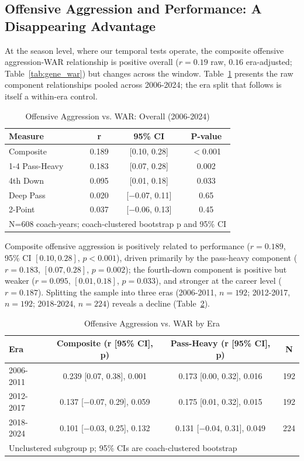 \documentclass[USenglish]{article}
\theoremstyle{dgthm}
\theoremstyle{dgdef}
\begin{document}
\subsection{Offensive Aggression and Performance: A Disappearing Advantage}

At the season level, where our temporal tests operate, the composite offensive aggression-WAR relationship is positive overall ($r=0.19$ raw, $0.16$ era-adjusted; Table~\ref{tab:gene_war}) but changes across the window. Table~\ref{tab:overall_war} presents the raw component relationships pooled across 2006-2024; the era split that follows is itself a within-era control.

\begin{table}[H]
\caption{Offensive Aggression vs. WAR: Overall (2006-2024)}
\label{tab:overall_war}
\begin{tabular}{lccc}
\toprule
\textbf{Measure} & \textbf{r} & \textbf{95\% CI} & \textbf{P-value} \\
\midrule
Composite & 0.189 & [0.10, 0.28] & $<$0.001 \\
\cmidrule{1-4}
Pass-Heavy & 0.183 & [0.07, 0.28] & 0.002 \\
4th Down & 0.095 & [0.01, 0.18] & 0.033 \\
Deep Pass & 0.020 & [$-$0.07, 0.11] & 0.65 \\
2-Point & 0.037 & [$-$0.06, 0.13] & 0.45 \\
\midrule
\multicolumn{4}{l}{\small N=608 coach-years; coach-clustered bootstrap p and 95\% CI}\\
\bottomrule
\end{tabular}
\end{table}

Composite offensive aggression is positively related to performance ($r=0.189$, 95\% CI $[0.10, 0.28]$, $p<0.001$), driven primarily by the pass-heavy component ($r=0.183$, $[0.07, 0.28]$, $p=0.002$); the fourth-down component is positive but weaker ($r=0.095$, $[0.01, 0.18]$, $p=0.033$), and stronger at the career level ($r=0.187$). Splitting the sample into three eras (2006-2011, $n=192$; 2012-2017, $n=192$; 2018-2024, $n=224$) reveals a decline (Table~\ref{tab:era_war}).

\begin{table}[H]
\caption{Offensive Aggression vs. WAR by Era}
\label{tab:era_war}
\small
\begin{tabular}{lccc}
\toprule
\textbf{Era} & \textbf{Composite (r [95\% CI], p)} & \textbf{Pass-Heavy (r [95\% CI], p)} & \textbf{N} \\
\midrule
2006-2011 & 0.239 [0.07, 0.38], 0.001 & 0.173 [0.00, 0.32], 0.016 & 192 \\
2012-2017 & 0.137 [$-$0.07, 0.29], 0.059 & 0.175 [0.01, 0.32], 0.015 & 192 \\
2018-2024 & 0.101 [$-$0.03, 0.25], 0.132 & 0.131 [$-$0.04, 0.31], 0.049 & 224 \\
\midrule
\multicolumn{4}{l}{\small Unclustered subgroup p; 95\% CIs are coach-clustered bootstrap}\\
\bottomrule
\end{tabular}
\end{table}
\end{document}
